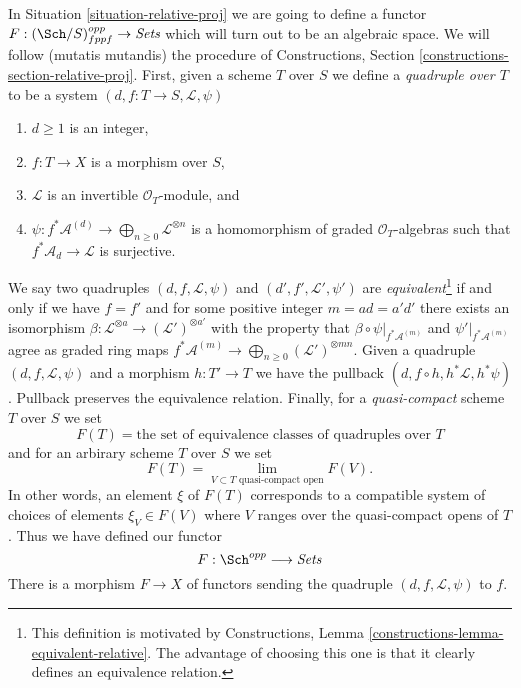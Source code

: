 \noindent
In Situation \ref{situation-relative-proj} we are going to define
a functor $F : (\Sch/S)_{fppf}^{opp} \to \textit{Sets}$ which will
turn out to be an algebraic space. We will follow (mutatis mutandis)
the procedure of
Constructions, Section \ref{constructions-section-relative-proj}.
First, given a scheme $T$ over $S$ we define a
{\it quadruple over $T$} to be a system
$(d, f : T \to S, \mathcal{L}, \psi)$
\begin{enumerate}
\item $d \geq 1$ is an integer,
\item $f : T \to X$ is a morphism over $S$,
\item $\mathcal{L}$ is an invertible $\mathcal{O}_T$-module, and
\item
$\psi : f^*\mathcal{A}^{(d)} \to \bigoplus_{n \geq 0}\mathcal{L}^{\otimes n}$
is a homomorphism of graded $\mathcal{O}_T$-algebras
such that $f^*\mathcal{A}_d \to \mathcal{L}$ is surjective.
\end{enumerate}
We say two quadruples $(d, f, \mathcal{L}, \psi)$ and
$(d', f', \mathcal{L}', \psi')$ are {\it equivalent}\footnote{This
definition is motivated by
Constructions, Lemma \ref{constructions-lemma-equivalent-relative}.
The advantage of choosing this one is that it clearly defines
an equivalence relation.}
if and only if
we have $f = f'$ and for some positive integer $m = ad = a'd'$
there exists an isomorphism
$\beta : \mathcal{L}^{\otimes a} \to (\mathcal{L}')^{\otimes a'}$
with the property that $\beta \circ \psi|_{f^*\mathcal{A}^{(m)}}$
and $\psi'|_{f^*\mathcal{A}^{(m)}}$ agree
as graded ring maps
$f^*\mathcal{A}^{(m)} \to \bigoplus_{n \geq 0} (\mathcal{L}')^{\otimes mn}$.
Given a quadruple $(d, f, \mathcal{L}, \psi)$
and a morphism $h : T' \to T$ we have the pullback
$(d, f \circ h, h^*\mathcal{L}, h^*\psi)$. Pullback preserves 
the equivalence relation. Finally, for a {\it quasi-compact} scheme $T$
over $S$ we set
$$
F(T) = \text{the set of equivalence classes of quadruples over }T
$$
and for an arbirary scheme $T$ over $S$ we set
$$
F(T)
=
\lim_{V \subset T\text{ quasi-compact open}} F(V).
$$
In other words, an element $\xi$ of $F(T)$ corresponds to a compatible
system of choices of elements $\xi_V \in F(V)$ where $V$ ranges over the
quasi-compact opens of $T$. Thus we have defined our functor
\begin{equation}
\label{equation-proj}
F : \Sch^{opp} \longrightarrow \textit{Sets}
\end{equation}
There is a morphism $F \to X$ of functors sending the quadruple
$(d, f, \mathcal{L}, \psi)$ to $f$.

